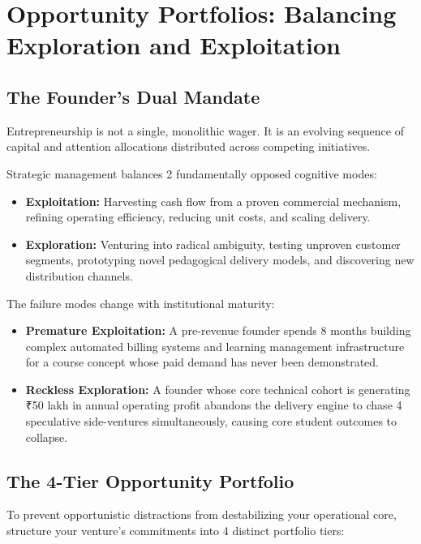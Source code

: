 \section{Opportunity Portfolios: Balancing Exploration and Exploitation}

\subsection{The Founder's Dual Mandate}

Entrepreneurship is not a single, monolithic wager. It is an evolving sequence of capital and attention allocations distributed across competing initiatives.

Strategic management balances 2 fundamentally opposed cognitive modes:
\begin{itemize}[leftmargin=10pt,itemsep=1pt,topsep=1pt]
  \item \textbf{Exploitation:} Harvesting cash flow from a proven commercial mechanism, refining operating efficiency, reducing unit costs, and scaling delivery.
  \item \textbf{Exploration:} Venturing into radical ambiguity, testing unproven customer segments, prototyping novel pedagogical delivery models, and discovering new distribution channels.
\end{itemize}

The failure modes change with institutional maturity:
\begin{itemize}[leftmargin=10pt,itemsep=1pt,topsep=1pt]
  \item \textbf{Premature Exploitation:} A pre-revenue founder spends 8 months building complex automated billing systems and learning management infrastructure for a course concept whose paid demand has never been demonstrated.
  \item \textbf{Reckless Exploration:} A founder whose core technical cohort is generating ₹50 lakh in annual operating profit abandons the delivery engine to chase 4 speculative side-ventures simultaneously, causing core student outcomes to collapse.
\end{itemize}

\subsection{The 4-Tier Opportunity Portfolio}

To prevent opportunistic distractions from destabilizing your operational core, structure your venture's commitments into 4 distinct portfolio tiers:


